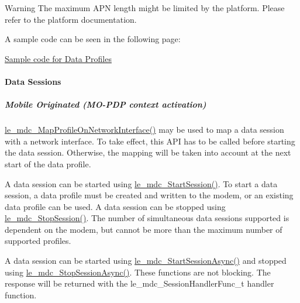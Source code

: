 \begin{DoxyWarning}{Warning}
The maximum A\+PN length might be limited by the platform. Please refer to the platform documentation.
\end{DoxyWarning}
A sample code can be seen in the following page\+:
\begin{DoxyItemize}
\item \hyperlink{c_mdcDataProfiles}{Sample code for Data Profiles}
\end{DoxyItemize}\hypertarget{c_mdc_le_mdc_session}{}\paragraph{Data Sessions}\label{c_mdc_le_mdc_session}
\hypertarget{c_mdc_le_mdc_session_MO}{}\subparagraph{Mobile Originated (\+M\+O-\/\+P\+D\+P context activation)}\label{c_mdc_le_mdc_session_MO}
\hyperlink{le__mdc__interface_8h_a56cd547a4e2b9cc98c1f0d052aeb92e6}{le\+\_\+mdc\+\_\+\+Map\+Profile\+On\+Network\+Interface()} may be used to map a data session with a network interface. To take effect, this A\+PI has to be called before starting the data session. Otherwise, the mapping will be taken into account at the next start of the data profile.

A data session can be started using \hyperlink{le__mdc__interface_8h_a2cb08d5c3e6c43297d80448891719649}{le\+\_\+mdc\+\_\+\+Start\+Session()}. To start a data session, a data profile must be created and written to the modem, or an existing data profile can be used. A data session can be stopped using \hyperlink{le__mdc__interface_8h_a53453f85065c3cace0922150b7e3d869}{le\+\_\+mdc\+\_\+\+Stop\+Session()}. The number of simultaneous data sessions supported is dependent on the modem, but cannot be more than the maximum number of supported profiles.

A data session can be started using \hyperlink{le__mdc__interface_8h_aa03d6e31263ddf8bf1d94b183c9934d9}{le\+\_\+mdc\+\_\+\+Start\+Session\+Async()} and stopped using \hyperlink{le__mdc__interface_8h_ac5b357f7437c9e253fa17b2511fa14ef}{le\+\_\+mdc\+\_\+\+Stop\+Session\+Async()}. These functions are not blocking. The response will be returned with the {\ttfamily le\+\_\+mdc\+\_\+\+Session\+Handler\+Func\+\_\+t} handler function.

